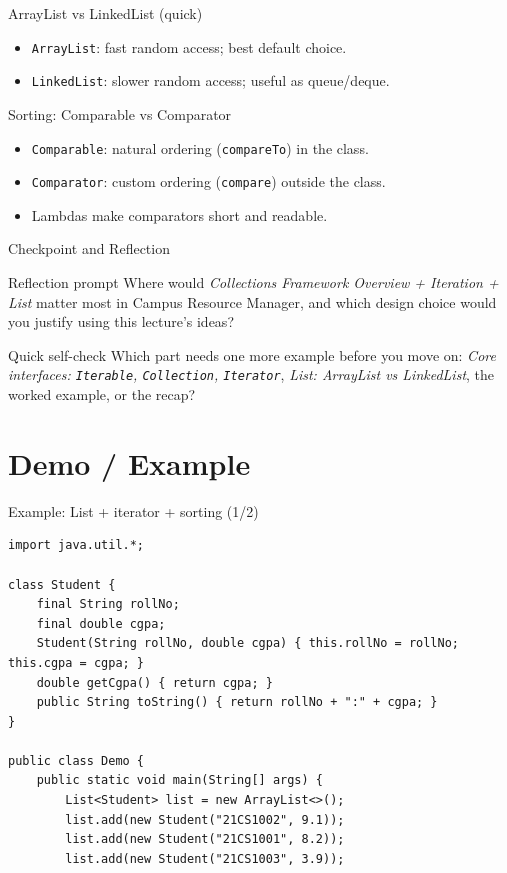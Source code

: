 \documentclass{beamer}
\begin{document}
\begin{frame}{ArrayList vs LinkedList (quick)}
  \begin{itemize}[<+->]
    \item \texttt{ArrayList}: fast random access; best default choice.
    \item \texttt{LinkedList}: slower random access; useful as queue/deque.
  \end{itemize}
  \slidesources{\OOPSUnitVSources}
\end{frame}

\begin{frame}{Sorting: Comparable vs Comparator}
  \begin{itemize}[<+->]
    \item \texttt{Comparable}: natural ordering (\texttt{compareTo}) in the class.
    \item \texttt{Comparator}: custom ordering (\texttt{compare}) outside the class.
    \item Lambdas make comparators short and readable.
  \end{itemize}
  \slidesources{\OOPSUnitVSources}
\end{frame}

\begin{frame}{Checkpoint and Reflection}
\begin{block}{Reflection prompt}
Where would \textit{Collections Framework Overview + Iteration + List} matter most in Campus Resource Manager, and which design choice would you justify using this lecture's ideas?
\end{block}
\begin{block}{Quick self-check}
Which part needs one more example before you move on: \textit{Core interfaces: \texttt{Iterable}, \texttt{Collection}, \texttt{Iterator}}, \textit{List: ArrayList vs LinkedList}, the worked example, or the recap?
\end{block}
  \slidesources{\OOPSUnitVSources}
\end{frame}

\section{Demo / Example}
\label{sec:demo}

\begin{frame}[fragile,shrink=8]{Example: List + iterator + sorting (1/2)}
\begin{lstlisting}
import java.util.*;

class Student {
    final String rollNo;
    final double cgpa;
    Student(String rollNo, double cgpa) { this.rollNo = rollNo; this.cgpa = cgpa; }
    double getCgpa() { return cgpa; }
    public String toString() { return rollNo + ":" + cgpa; }
}

public class Demo {
    public static void main(String[] args) {
        List<Student> list = new ArrayList<>();
        list.add(new Student("21CS1002", 9.1));
        list.add(new Student("21CS1001", 8.2));
        list.add(new Student("21CS1003", 3.9));
\end{lstlisting}
  \slidesources{\OOPSUnitVSources}
\end{frame}
\end{document}
